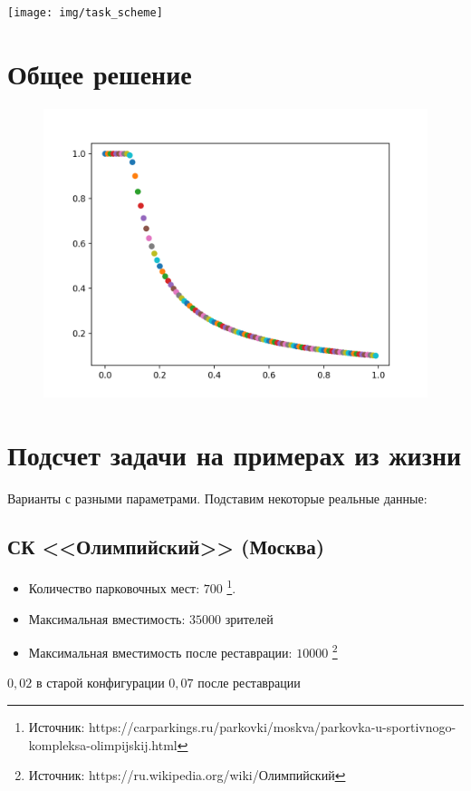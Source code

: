 \bigskip

\texttt{[image: img/task\_scheme]}


\section{Общее решение}

\begin{figure}
	\includegraphics[scale=0.8]{img/Figure_1}
\end{figure}

\section{Подсчет задачи на примерах из жизни}

Варианты с разными параметрами. Подставим некоторые реальные данные:

\subsection{СК <<Олимпийский>> (Москва)}

\begin{itemize}
	\item Количество парковочных мест: $700$ \footnote{Источник: https://carparkings.ru/parkovki/moskva/parkovka-u-sportivnogo-kompleksa-olimpijskij.html}.
	\item Максимальная вместимость: $35 000$ зрителей
	\item Максимальная вместимость после реставрации: $10 000$ \footnote{Источник: https://ru.wikipedia.org/wiki/Олимпийский}
\end{itemize}
$0,02$ в старой конфигурации
$0,07$ после реставрации

